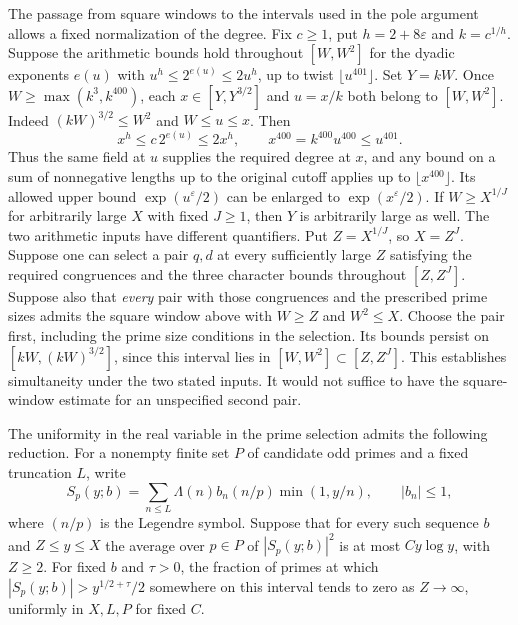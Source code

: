 \documentclass[11pt]{amsart}
\theoremstyle{definition}
\theoremstyle{remark}
\begin{document}
The passage from square windows to the intervals used in the pole
argument allows a fixed normalization of the degree. Fix $c\ge1$, put
$h=2+8\varepsilon$ and $k=c^{1/h}$. Suppose the arithmetic bounds
hold throughout $[W,W^2]$ for the dyadic exponents $e(u)$ with
$u^h\le2^{e(u)}\le2u^h$, up to twist $\lfloor u^{401}\rfloor$.
Set $Y=kW$. Once $W\ge\max(k^3,k^{400})$, each
$x\in[Y,Y^{3/2}]$ and $u=x/k$ both belong to $[W,W^2]$.
Indeed $(kW)^{3/2}\le W^2$ and $W\le u\le x$. Then
\[
 x^h\le c\,2^{e(u)}\le2x^h,\qquad
 x^{400}=k^{400}u^{400}\le u^{401}.
\]
Thus the same field at $u$ supplies the required degree at $x$,
and any bound on a sum of nonnegative lengths up to the original
cutoff applies up to $\lfloor x^{400}\rfloor$. Its allowed upper
bound $\exp(u^\varepsilon/2)$ can be enlarged to
$\exp(x^\varepsilon/2)$. If $W\ge X^{1/J}$ for arbitrarily large
$X$ with fixed $J\ge1$, then $Y$ is arbitrarily large as well.
The two arithmetic inputs have different quantifiers. Put
$Z=X^{1/J}$, so $X=Z^J$. Suppose one can select a pair $q,d$ at
every sufficiently large $Z$ satisfying the required congruences and
the three character bounds throughout $[Z,Z^J]$. Suppose also that
\emph{every} pair with those congruences and the prescribed prime
sizes admits the square window above with $W\ge Z$ and $W^2\le X$.
Choose the pair first, including the prime size conditions in the
selection. Its bounds persist on $[kW,(kW)^{3/2}]$, since this
interval lies in $[W,W^2]\subset[Z,Z^J]$. This establishes
simultaneity under the two stated inputs. It would not suffice to
have the square-window estimate for an unspecified second pair.

The uniformity in the real variable in the prime selection admits
the following reduction. For a nonempty finite set $P$ of candidate
odd primes and a fixed truncation $L$, write
\[
 S_p(y;b)=\sum_{n\le L}\Lambda(n)b_n(n/p)\min(1,y/n),
 \qquad |b_n|\le1,
\]
where $(n/p)$ is the Legendre symbol. Suppose that for every such
sequence $b$ and $Z\le y\le X$ the average over $p\in P$ of
$|S_p(y;b)|^2$ is at most $Cy\log y$, with $Z\ge2$.
For fixed $b$ and $\tau>0$, the fraction of primes at which
$|S_p(y;b)|>y^{1/2+\tau}/2$ somewhere on this interval tends to
zero as $Z\to\infty$, uniformly in $X,L,P$ for fixed $C$.
\end{document}
